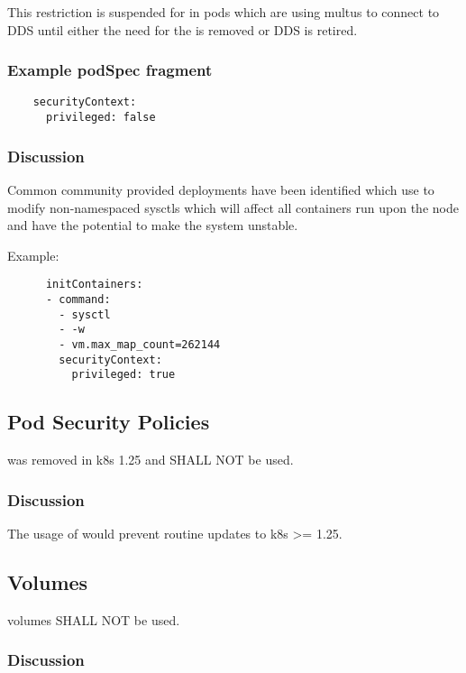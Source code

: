 \documentclass[PMO,authoryear,toc]{lsstdoc}
\begin{document}
This restriction is suspended for  in pods which are using multus to connect to DDS until either the need for the  is removed or DDS is retired.

\subsubsection{Example podSpec fragment}

\begin{verbatim}
    securityContext:
      privileged: false
\end{verbatim}

\subsubsection{Discussion}

Common community provided deployments have been identified which use  to modify non-namespaced sysctls which will affect all containers run upon the node and have the potential to make the system unstable.

Example:

\begin{verbatim}
      initContainers:
      - command:
        - sysctl
        - -w
        - vm.max_map_count=262144
        securityContext:
          privileged: true
\end{verbatim}

\subsection{Pod Security Policies}

 was removed in k8s 1.25 and SHALL NOT be used.

\subsubsection{Discussion}

The usage of  would prevent routine updates to k8s >= 1.25.

\subsection{ Volumes}

 volumes SHALL NOT be used.

\subsubsection{Discussion}
\end{document}
